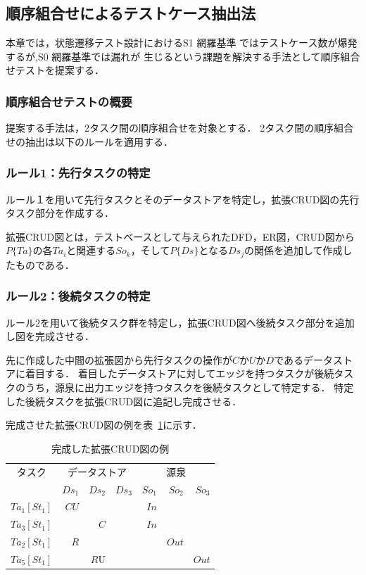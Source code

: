 \documentclass[10pt,a4j]{jarticle}
\begin{document}
\subsection{順序組合せによるテストケース抽出法} \label{sec:5-2}
本章では，状態遷移テスト設計におけるS1 網羅基準 ではテストケース数が爆発するが,S0 網羅基準では漏れが 生じるという課題を解決する手法として順序組合せテストを提案する．

\subsubsection{順序組合せテストの概要} \label{sec:5-2-1}
提案する手法は，2タスク間の順序組合せを対象とする．
2タスク間の順序組合せの抽出は以下のルールを適用する．
\subsubsection{ルール1：先行タスクの特定}
ルール１を用いて先行タスクとそのデータストアを特定し，拡張CRUD図の先行タスク部分を作成する．

拡張CRUD図とは，テストベースとして与えられたDFD，ER図，CRUD図から$P\{Ta\}$の各$Ta_i$と関連する$So_k$，そして$P\{Ds\}$となる$Ds_j$の関係を追加して作成したものである．

\subsubsection{ルール2：後続タスクの特定}
ルール2を用いて後続タスク群を特定し，拡張CRUD図へ後続タスク部分を追加し図を完成させる．

先に作成した中間の拡張図から先行タスクの操作が$C$か$U$か$D$であるデータストアに着目する．
着目したデータストアに対してエッジを持つタスクが後続タスクのうち，源泉に出力エッジを持つタスクを後続タスクとして特定する．
特定した後続タスクを拡張CRUD図に追記し完成させる．

完成させた拡張CRUD図の例を表~\ref{excrud}に示す．
\begin{table}[t]
  \centering
  \caption{完成した拡張CRUD図の例}
    \begin{tabular}{r|r|r|r|r|r|r}
    \multicolumn{1}{c|}{タスク} & \multicolumn{3}{c|}{データストア} & \multicolumn{3}{c}{源泉} \\
\cline{2-7}    \multicolumn{1}{c|}{} & $Ds_1$ & $Ds_2$ & $Ds_3$ & $So_1$ & $So_2$ & $So_3$ \\
    \hline
    \hline
    $Ta_1[St_1]$ & $CU$ &   &   & $In$ &   &  \\
    \hline
    $Ta_3[St_1]$ &   & $C$ &   & $In$ &   &  \\
    \hline
    $Ta_2[St_1]$ & $R$ &   &   &   & $Out$ &  \\
    \hline
    $Ta_5[St_1]$ &   & $R$U &   &   &   & $Out$ \\
    \end{tabular}%
  \label{excrud}%
\end{table}%
\end{document}
